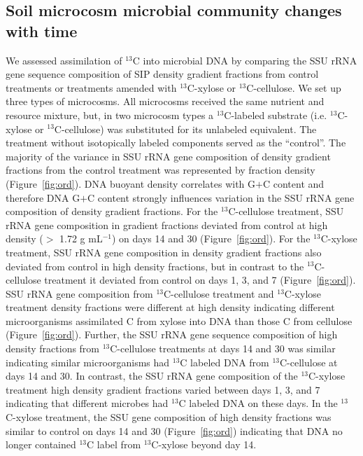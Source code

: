 \subsection{Soil microcosm microbial community changes with time}
We assessed assimilation of $^{13}$C into microbial DNA by comparing
the SSU rRNA gene sequence composition of SIP density gradient fractions from
control treatments or treatments amended with $^{13}$C-xylose or
$^{13}$C-cellulose. We set up three types of microcosms. All microcosms
received the same nutrient and resource mixture, but, in two microcosm types
a $^{13}$C-labeled substrate (i.e. $^{13}$C-xylose or $^{13}$C-cellulose) was
substituted for its unlabeled equivalent. The treatment without isotopically
labeled components served as the ``control''. The majority of the variance in SSU rRNA gene
composition of density gradient fractions from the control treatment was
represented by fraction density (Figure~\ref{fig:ord}). DNA buoyant density
correlates with G$+$C content \citep{Buckley_2007} and therefore DNA G$+$C
content strongly influences variation in the SSU rRNA gene composition of
density gradient fractions. For the $^{13}$C-cellulose treatment, SSU rRNA gene
composition in gradient fractions deviated from control at high density ($>$
1.72 g mL$^{-1}$) on days 14 and 30 (Figure~\ref{fig:ord}). For the
$^{13}$C-xylose treatment, SSU rRNA gene composition in density gradient
fractions also deviated from control in high density fractions, but in contrast
to the $^{13}$C-cellulose treatment it deviated from control on days 1, 3, and
7 (Figure~\ref{fig:ord}). SSU rRNA gene composition from $^{13}$C-cellulose
treatment and $^{13}$C-xylose treatment density fractions were different at
high density indicating different microorganisms assimilated C from xylose
into DNA than those C from cellulose (Figure~\ref{fig:ord}).
Further, the SSU rRNA gene sequence composition of high density fractions
from $^{13}$C-cellulose treatments at days 14 and 30 was similar indicating
similar microorganisms had $^{13}$C labeled DNA from $^{13}$C-cellulose at
days 14 and 30. In contrast, the SSU rRNA gene composition of the
$^{13}$C-xylose treatment high density gradient fractions varied between days
1, 3, and 7 indicating that different microbes had $^{13}$C labeled DNA on
these days. In the $^{13}$C-xylose treatment, the SSU gene composition of
high density fractions was similar to control on days 14 and 30
(Figure~\ref{fig:ord}) indicating that DNA no longer contained $^{13}$C label
from $^{13}$C-xylose beyond day 14. 

